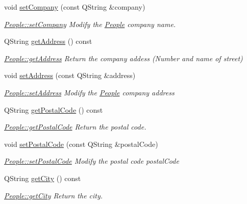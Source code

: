 \begin{DoxyCompactItemize}
void \hyperlink{classModels_1_1People_aded3f48b5afb01c78379c9a63c35d5c3}{set\-Company} (const Q\-String \&company)
\begin{DoxyCompactList}\small\item\em \hyperlink{classModels_1_1People_aded3f48b5afb01c78379c9a63c35d5c3}{People\-::set\-Company} Modify the \hyperlink{classModels_1_1People}{People} {\itshape company} name. \end{DoxyCompactList}\item 
Q\-String \hyperlink{classModels_1_1People_a4d327556f59357912c54c14cf940151d}{get\-Address} () const 
\begin{DoxyCompactList}\small\item\em \hyperlink{classModels_1_1People_a4d327556f59357912c54c14cf940151d}{People\-::get\-Address} Return the company addess (Number and name of street) \end{DoxyCompactList}\item 
void \hyperlink{classModels_1_1People_ab4e49bbc2de9ed31276e50e768c9bdee}{set\-Address} (const Q\-String \&address)
\begin{DoxyCompactList}\small\item\em \hyperlink{classModels_1_1People_ab4e49bbc2de9ed31276e50e768c9bdee}{People\-::set\-Address} Modify the \hyperlink{classModels_1_1People}{People} company {\itshape address} \end{DoxyCompactList}\item 
Q\-String \hyperlink{classModels_1_1People_a30999a844f67ddef254e2c2343df8946}{get\-Postal\-Code} () const 
\begin{DoxyCompactList}\small\item\em \hyperlink{classModels_1_1People_a30999a844f67ddef254e2c2343df8946}{People\-::get\-Postal\-Code} Return the postal code. \end{DoxyCompactList}\item 
void \hyperlink{classModels_1_1People_a89ea420d87ce7e32e8fc1b7a83616eaf}{set\-Postal\-Code} (const Q\-String \&postal\-Code)
\begin{DoxyCompactList}\small\item\em \hyperlink{classModels_1_1People_a89ea420d87ce7e32e8fc1b7a83616eaf}{People\-::set\-Postal\-Code} Modify the postal code {\itshape postal\-Code} \end{DoxyCompactList}\item 
Q\-String \hyperlink{classModels_1_1People_a478528b88890758e11887f9d48372680}{get\-City} () const 
\begin{DoxyCompactList}\small\item\em \hyperlink{classModels_1_1People_a478528b88890758e11887f9d48372680}{People\-::get\-City} Return the city. \end{DoxyCompactList}\item 

\end{DoxyCompactItemize}
